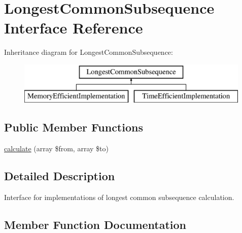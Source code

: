 \hypertarget{interface_sebastian_bergmann_1_1_diff_1_1_l_c_s_1_1_longest_common_subsequence}{}\section{Longest\+Common\+Subsequence Interface Reference}
\label{interface_sebastian_bergmann_1_1_diff_1_1_l_c_s_1_1_longest_common_subsequence}
Inheritance diagram for Longest\+Common\+Subsequence\+:\begin{figure}[H]
\begin{center}
\leavevmode
\includegraphics[height=2.000000cm]{interface_sebastian_bergmann_1_1_diff_1_1_l_c_s_1_1_longest_common_subsequence}
\end{center}
\end{figure}
\subsection*{Public Member Functions}
\begin{DoxyCompactItemize}
\item 
\mbox{\hyperlink{interface_sebastian_bergmann_1_1_diff_1_1_l_c_s_1_1_longest_common_subsequence_a008d2ee23b87fa34470482270c5918a3}{calculate}} (array \$from, array \$to)
\end{DoxyCompactItemize}


\subsection{Detailed Description}
Interface for implementations of longest common subsequence calculation. 

\subsection{Member Function Documentation}
\mbox{\label{interface_sebastian_bergmann_1_1_diff_1_1_l_c_s_1_1_longest_common_subsequence_a008d2ee23b87fa34470482270c5918a3}} 
